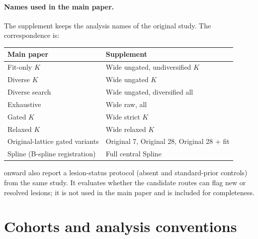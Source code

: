 \clearpage
\setcounter{page}{1}
\maketitlesupplementary

\setcounter{section}{0}\setcounter{figure}{0}\setcounter{table}{0}\setcounter{equation}{0}\setcounter{algorithm}{0}
\renewcommand{\thesection}{S\arabic{section}}
\renewcommand{\thetable}{S\arabic{table}}
\renewcommand{\thefigure}{S\arabic{figure}}
\renewcommand{\theequation}{S\arabic{equation}}
\renewcommand{\thealgorithm}{S\arabic{algorithm}}

\paragraph{Names used in the main paper.}
The supplement keeps the analysis names of the original study. The correspondence is:
\begin{center}\footnotesize
\setlength{\tabcolsep}{4pt}
\begin{tabular}{ll}
\toprule
Main paper & Supplement \\
\midrule
Fit-only $K$ & Wide ungated, undiversified $K$ \\
Diverse $K$ & Wide ungated $K$ \\
Diverse search & Wide ungated, diversified all \\
Exhaustive & Wide raw, all \\
Gated $K$ & Wide strict $K$ \\
Relaxed $K$ & Wide relaxed $K$ \\
Original-lattice gated variants & Original 7, Original 28, Original 28 + fit \\
Spline (B-spline registration) & Full central Spline \\
\bottomrule
\end{tabular}
\end{center}
 onward also report a lesion-status protocol (absent and standard-prior controls) from the same study. It evaluates whether the candidate routes can flag new or resolved lesions; it is not used in the main paper and is included for completeness.

\section{Cohorts and analysis conventions}
\begin{table}[t]
\centering\small
\caption{Archived LUNA25 flow. The earlier-track and first-recorded categories have unknown status for the chosen prior.}
\label{tab:cohorts}

\end{table}

